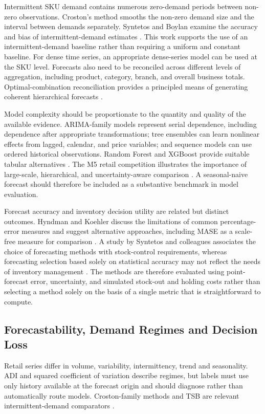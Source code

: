 \documentclass[a4paper,11pt,oneside]{book}
\theoremstyle{plain}
\theoremstyle{definition}
\theoremstyle{remark}
\begin{document}
Intermittent SKU demand contains numerous zero-demand periods between non-zero observations. Croston's method smooths the non-zero demand size and the interval between demands separately. Syntetos and Boylan examine the accuracy and bias of intermittent-demand estimates \cite{syntetos2005intermittent}. This work supports the use of an intermittent-demand baseline rather than requiring a uniform and constant baseline. For dense time series, an appropriate dense-series model can be used at the SKU level. Forecasts also need to be reconciled across different levels of aggregation, including product, category, branch, and overall business totals. Optimal-combination reconciliation provides a principled means of generating coherent hierarchical forecasts \cite{hyndman2011hierarchical}.

Model complexity should be proportionate to the quantity and quality of the available evidence. ARIMA-family models represent serial dependence, including dependence after appropriate transformations; tree ensembles can learn nonlinear effects from lagged, calendar, and price variables; and sequence models can use ordered historical observations. Random Forest and XGBoost provide suitable tabular alternatives \cite{breiman2001rf,chen2016xgboost}. The M5 retail competition illustrates the importance of large-scale, hierarchical, and uncertainty-aware comparison \cite{makridakis2022m5}. A seasonal-naive forecast should therefore be included as a substantive benchmark in model evaluation.

Forecast accuracy and inventory decision utility are related but distinct outcomes. Hyndman and Koehler discuss the limitations of common percentage-error measures and suggest alternative approaches, including MASE as a scale-free measure for comparison \cite{hyndman2006accuracy}. A study by Syntetos and colleagues associates the choice of forecasting methods with stock-control requirements, whereas forecasting selection based solely on statistical accuracy may not reflect the needs of inventory management \cite{syntetos2010stock}. The methods are therefore evaluated using point-forecast error, uncertainty, and simulated stock-out and holding costs rather than selecting a method solely on the basis of a single metric that is straightforward to compute.


\subsection{Forecastability, Demand Regimes and Decision Loss}
Retail series differ in volume, variability, intermittency, trend and
seasonality. ADI and squared coefficient of variation describe regimes,
but labels must use only history available at the forecast origin and
should diagnose rather than automatically route models. Croston-family
methods and TSB are relevant intermittent-demand comparators
\cite{croston1972intermittent,syntetos2005intermittent,teunter2011demand}.
\end{document}
